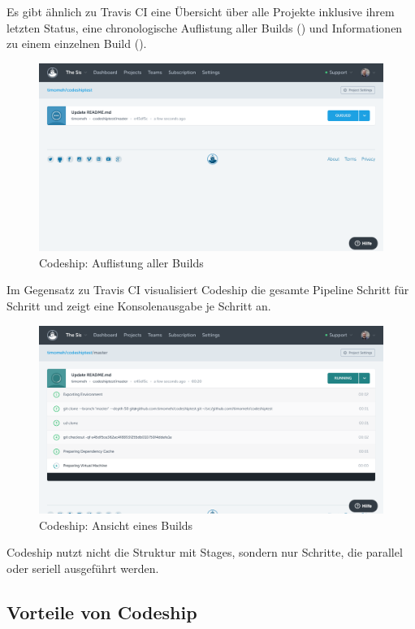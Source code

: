 Es gibt ähnlich zu Travis CI eine Übersicht über alle Projekte inklusive ihrem letzten Status, eine chronologische Auflistung aller Builds () und Informationen zu einem einzelnen Build ().

\begin{figure}[h]
  \caption{Codeship: Auflistung aller Builds}
  \label{fig:codeship-builds}
  \includegraphics[width=.8\textwidth]{assets/codeship-builds}
\end{figure}

Im Gegensatz zu Travis CI visualisiert Codeship die gesamte Pipeline Schritt für Schritt und zeigt eine Konsolenausgabe je Schritt an.

\begin{figure}[h]
  \caption{Codeship: Ansicht eines Builds}
  \label{fig:codeship-build-details}
  \includegraphics[width=.8\textwidth]{assets/codeship-build-details}
\end{figure}

Codeship nutzt nicht die Struktur mit Stages, sondern nur Schritte, die parallel oder seriell ausgeführt werden.

\subsection*{Vorteile von Codeship}

